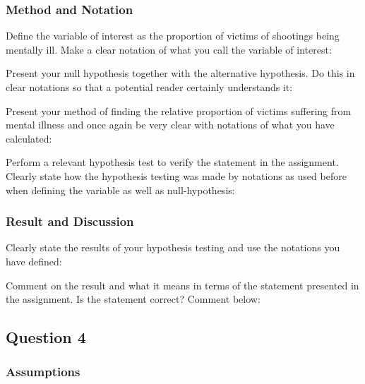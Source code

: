 \documentclass[a4paper, 10pt,serif]{article}
\begin{document}
\bigskip
\bigskip
\bigskip
\bigskip

\subsubsection*{Method and Notation}

Define the variable of interest as the proportion of victims of shootings being mentally ill. Make a clear notation of what you call the variable of interest:

\bigskip
\bigskip
\bigskip
\bigskip

\noindent
Present your null hypothesis together with the alternative hypothesis. Do this in clear notations so that a potential reader certainly understands it:

\bigskip
\bigskip
\bigskip
\bigskip

\noindent
Present your method of finding the relative proportion of victims suffering from mental illness and once again be very clear with notations of what you have calculated:

\bigskip
\bigskip
\bigskip
\bigskip

\noindent
Perform a relevant hypothesis test to verify the statement in the assignment. Clearly state how the hypothesis testing was made by notations as used before when defining the variable as well as null-hypothesis:

\bigskip
\bigskip
\bigskip
\bigskip

\subsubsection*{Result and Discussion}

Clearly state the results of your hypothesis testing and use the notations you have defined:

\bigskip
\bigskip
\bigskip
\bigskip

\noindent
Comment on the result and what it means in terms of the statement presented in the assignment. Is the statement correct? Comment below:

\newpage
\subsection*{Question 4}

\subsubsection*{Assumptions}
\end{document}
